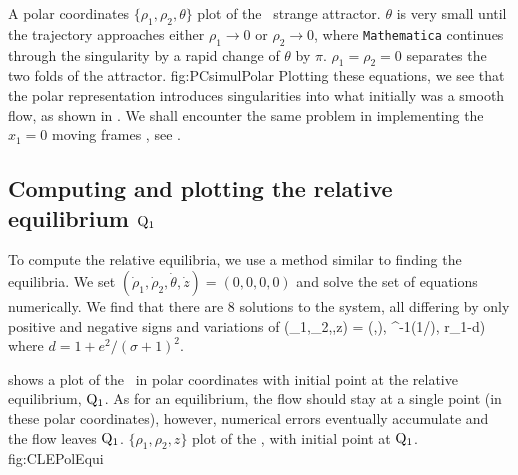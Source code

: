 {}{
A polar coordinates $\{\rho_1,\rho_2,\theta\}$ plot of the
\cLf\ strange attractor. $\theta$ is very small until the
trajectory approaches either $\rho_1 \to 0$ or $\rho_2 \to
0$, where \texttt{Mathematica} continues through the
singularity by a rapid change of $\theta$ by $\pi$.
$\rho_1 = \rho_2 =
0$ separates the two folds of the attractor.
    }{fig:PCsimulPolar}
Plotting these equations, we see that the polar
representation introduces singularities into what initially
was a smooth flow, as shown in . We
shall encounter the same problem in implementing the $x_1=0$
moving frames \slice, see .

\subsection{Computing and plotting the relative equilibrium $\mathrm{Q}_{1}$}

To compute the relative equilibria, we use a method similar to finding the equilibria. We set $(\dot\rho_1, \dot\rho_2, \dot\theta, \dot z)=(0, 0, 0, 0)$ and solve the set of equations numerically. We find that there are 8 solutions to the system, all differing by only positive and negative signs and variations of
\beq
(\rho_1,\rho_2,\theta,z) =
\left(,),
      \pm \cos^{-1}\left({1}/{}\right),
      r_1-d\right)
\label{eq:E1-PC}
\eeq
where $d=1 + {e^2}/{(\sigma +1)^2}$.

 shows a plot of the \cLf\ in polar
coordinates with initial point at the relative equilibrium,
$\mathrm{Q}_{1}$. As for an equilibrium, the flow should stay at a
single point (in these polar coordinates), however, numerical
errors eventually accumulate and the flow leaves $\mathrm{Q}_{1}$.
{}{
$\{\rho_1,\rho_2,z\}$ plot of the \cLf, with initial point
at $\mathrm{Q}_{1}$.
}
{fig:CLEPolEqui}

